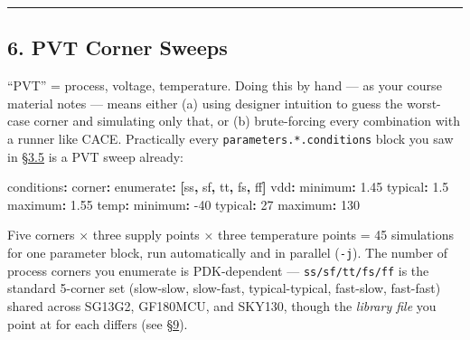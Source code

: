 \documentclass[
]{article}
\newenvironment{Shaded}{}{}
\newcommand{\AttributeTok}[1]{\textcolor[rgb]{0.49,0.56,0.16}{#1}}
\newcommand{\DecValTok}[1]{\textcolor[rgb]{0.25,0.63,0.44}{#1}}
\newcommand{\FloatTok}[1]{\textcolor[rgb]{0.25,0.63,0.44}{#1}}
\newcommand{\FunctionTok}[1]{\textcolor[rgb]{0.02,0.16,0.49}{#1}}
\newcommand{\KeywordTok}[1]{\textcolor[rgb]{0.00,0.44,0.13}{\textbf{#1}}}
\begin{document}
\begin{center}\rule{0.5\linewidth}{0.5pt}\end{center}

\hypertarget{pvt-corner-sweeps}{%
\subsection{6. PVT Corner Sweeps}\label{pvt-corner-sweeps}}

``PVT'' = process, voltage, temperature. Doing this by hand --- as your
course material notes --- means either (a) using designer intuition to
guess the worst-case corner and simulating only that, or (b)
brute-forcing every combination with a runner like CACE. Practically
every \texttt{parameters.*.conditions} block you saw in
\protect\hyperlink{35-parameters--spec-tool-conditions-plot}{§3.5} is a
PVT sweep already:

\begin{Shaded}
\begin{Highlighting}[]
\FunctionTok{conditions}\KeywordTok{:}
\AttributeTok{  }\FunctionTok{corner}\KeywordTok{:}
\AttributeTok{    }\FunctionTok{enumerate}\KeywordTok{:}\AttributeTok{ }\KeywordTok{[}\AttributeTok{ss}\KeywordTok{,}\AttributeTok{ sf}\KeywordTok{,}\AttributeTok{ tt}\KeywordTok{,}\AttributeTok{ fs}\KeywordTok{,}\AttributeTok{ ff}\KeywordTok{]}
\AttributeTok{  }\FunctionTok{vdd}\KeywordTok{:}
\AttributeTok{    }\FunctionTok{minimum}\KeywordTok{:}\AttributeTok{ }\FloatTok{1.45}
\AttributeTok{    }\FunctionTok{typical}\KeywordTok{:}\AttributeTok{ }\FloatTok{1.5}
\AttributeTok{    }\FunctionTok{maximum}\KeywordTok{:}\AttributeTok{ }\FloatTok{1.55}
\AttributeTok{  }\FunctionTok{temp}\KeywordTok{:}
\AttributeTok{    }\FunctionTok{minimum}\KeywordTok{:}\AttributeTok{ }\DecValTok{{-}40}
\AttributeTok{    }\FunctionTok{typical}\KeywordTok{:}\AttributeTok{ }\DecValTok{27}
\AttributeTok{    }\FunctionTok{maximum}\KeywordTok{:}\AttributeTok{ }\DecValTok{130}
\end{Highlighting}
\end{Shaded}

Five corners × three supply points × three temperature points = 45
simulations for one parameter block, run automatically and in parallel
(\texttt{-j}). The number of process corners you enumerate is
PDK-dependent --- \texttt{ss/sf/tt/fs/ff} is the standard 5-corner set
(slow-slow, slow-fast, typical-typical, fast-slow, fast-fast) shared
across SG13G2, GF180MCU, and SKY130, though the \emph{library file} you
point at for each differs (see
\protect\hyperlink{9-per-pdk-adaptation-sg13g2cmos5l-gf180mcu-sky130}{§9}).
\end{document}

